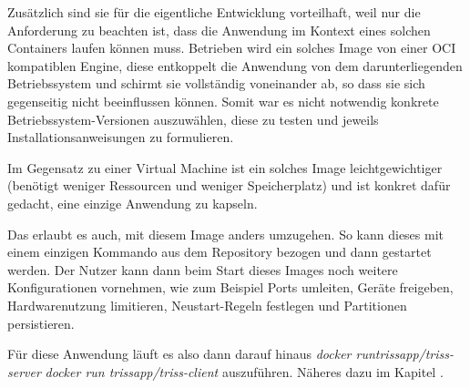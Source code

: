 Zusätzlich sind sie für die eigentliche Entwicklung vorteilhaft, weil nur die Anforderung zu beachten ist, dass die Anwendung im Kontext eines solchen Containers laufen können muss.
Betrieben wird ein solches Image von einer OCI kompatiblen Engine, diese entkoppelt die Anwendung von dem darunterliegenden Betriebssystem und schirmt sie vollständig voneinander ab, so dass sie sich gegenseitig nicht beeinflussen können.
Somit war es nicht notwendig konkrete Betriebssystem-Versionen auszuwählen, diese zu testen und jeweils Installationsanweisungen zu formulieren.

Im Gegensatz zu einer Virtual Machine ist ein solches Image leichtgewichtiger (benötigt weniger Ressourcen und weniger Speicherplatz) und ist konkret dafür gedacht, eine einzige Anwendung zu kapseln.

Das erlaubt es auch, mit diesem Image anders umzugehen.
So kann dieses mit einem einzigen Kommando aus dem Repository bezogen und dann gestartet werden.
Der Nutzer kann dann beim Start dieses Images noch weitere Konfigurationen vornehmen, wie zum Beispiel Ports umleiten, Geräte freigeben, Hardwarenutzung limitieren, Neustart-Regeln festlegen und Partitionen persistieren.

Für diese Anwendung läuft es also dann darauf hinaus \textit{docker run\linebreak trissapp/triss-server} \textit{docker run trissapp/triss-client} auszuführen.
Näheres dazu im Kapitel .
